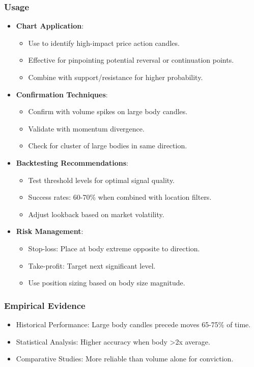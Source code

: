 \documentclass[12pt]{article}
\begin{document}
\subsubsection{Usage}
\begin{itemize}
\item \textbf{Chart Application}:
  \begin{itemize}
  \item Use to identify high-impact price action candles.
  \item Effective for pinpointing potential reversal or continuation points.
  \item Combine with support/resistance for higher probability.
  \end{itemize}
\item \textbf{Confirmation Techniques}:
  \begin{itemize}
  \item Confirm with volume spikes on large body candles.
  \item Validate with momentum divergence.
  \item Check for cluster of large bodies in same direction.
  \end{itemize}
\item \textbf{Backtesting Recommendations}:
  \begin{itemize}
  \item Test threshold levels for optimal signal quality.
  \item Success rates: 60-70\% when combined with location filters.
  \item Adjust lookback based on market volatility.
  \end{itemize}
\item \textbf{Risk Management}:
  \begin{itemize}
  \item Stop-loss: Place at body extreme opposite to direction.
  \item Take-profit: Target next significant level.
  \item Use position sizing based on body size magnitude.
  \end{itemize}
\end{itemize}

\subsubsection{Empirical Evidence}
\begin{itemize}
\item Historical Performance: Large body candles precede moves 65-75\% of time.
\item Statistical Analysis: Higher accuracy when body >2x average.
\item Comparative Studies: More reliable than volume alone for conviction.
\end{itemize}
\end{document}
